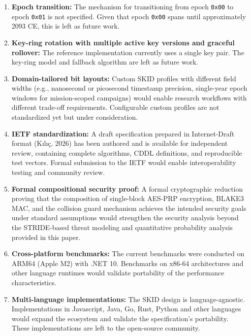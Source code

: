 \documentclass[fleqn,10pt]{wlpeerj}
\begin{document}
\begin{enumerate}
\def\labelenumi{\arabic{enumi}.}
\item
  \textbf{Epoch transition:} The mechanism for transitioning from epoch
  \texttt{0x00} to epoch \texttt{0x01} is not specified. Given that
  epoch \texttt{0x00} spans until approximately 2093 CE, this is left as
  future work.
\item
  \textbf{Key-ring rotation with multiple active key versions and
  graceful rollover:} The reference implementation currently uses a
  single key pair. The key-ring model and fallback algorithm are left as
  future work.
\item
  \textbf{Domain-tailored bit layouts:} Custom SKID profiles with
  different field widths (e.g., nanosecond or picosecond timestamp
  precision, single-year epoch windows for mission-scoped campaigns)
  would enable research workflows with different trade-off requirements.
  Configurable custom profiles are not standardized yet but under
  consideration.
\item
  \textbf{IETF standardization:} A draft specification prepared in
  Internet-Draft format (Kılıç, 2026) has been authored and is available
  for independent review, containing complete algorithms, CDDL
  definitions, and reproducible test vectors. Formal submission to the
  IETF would enable interoperability testing and community review.
\item
  \textbf{Formal compositional security proof:} A formal cryptographic
  reduction proving that the composition of single-block AES-PRP
  encryption, BLAKE3 MAC, and the collision guard mechanism achieves the
  intended security goals under standard assumptions would strengthen
  the security analysis beyond the STRIDE-based threat modeling and
  quantitative probability analysis provided in this paper.
\item
  \textbf{Cross-platform benchmarks:} The current benchmarks were
  conducted on ARM64 (Apple M2) with .NET 10. Benchmarks on x86-64
  architectures and other language runtimes would validate portability
  of the performance characteristics.
\item
  \textbf{Multi-language implementations:} The SKID design is
  language-agnostic. Implementations in Javascript, Java, Go, Rust,
  Python and other languages would expand the ecosystem and validate the
  specification's portability. These implementations are left to the
  open-source community.
\end{enumerate}
\end{document}
